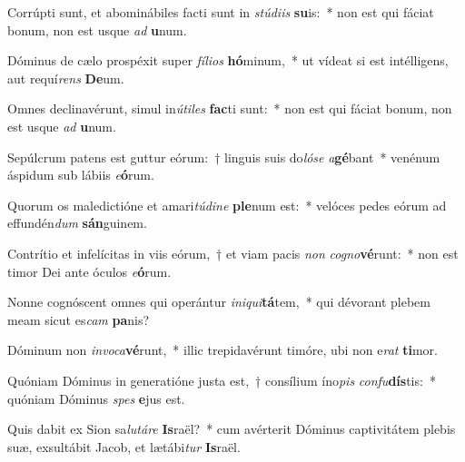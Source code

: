 \item Corrúpti sunt, et abominábiles facti sunt in \textit{stú}\textit{di}\textit{is} \textbf{su}is:~* non est qui fáciat bonum, non est usque \textit{ad} \textbf{u}num.
\item Dóminus de cælo prospéxit super \textit{fí}\textit{li}\textit{os} \textbf{hó}minum,~* ut vídeat si est intélligens, aut requí\textit{rens} \textbf{De}um.
\item Omnes declinavérunt, simul in\textit{ú}\textit{ti}\textit{les} \textbf{fac}ti sunt:~* non est qui fáciat bonum, non est usque \textit{ad} \textbf{u}num.
\item Sepúlcrum patens est guttur eórum:~† linguis suis do\textit{ló}\textit{se} \textit{a}\textbf{gé}bant~* venénum áspidum sub lábiis \textit{e}\textbf{ó}rum.
\item Quorum os maledictióne et amari\textit{tú}\textit{di}\textit{ne} \textbf{ple}num est:~* velóces pedes eórum ad effundén\textit{dum} \textbf{sán}guinem.
\item Contrítio et infelícitas in viis eórum,~† et viam pacis \textit{non} \textit{co}\textit{gno}\textbf{vé}runt:~* non est timor Dei ante óculos \textit{e}\textbf{ó}rum.
\item Nonne cognóscent omnes qui operántur \textit{in}\textit{i}\textit{qui}\textbf{tá}tem,~* qui dévorant plebem meam sicut es\textit{cam} \textbf{pa}nis?
\item Dóminum non \textit{in}\textit{vo}\textit{ca}\textbf{vé}runt,~* illic trepidavérunt timóre, ubi non e\textit{rat} \textbf{ti}mor.
\item Quóniam Dóminus in generatióne justa est,~† consílium íno\textit{pis} \textit{con}\textit{fu}\textbf{dís}tis:~* quóniam Dóminus \textit{spes} \textbf{e}jus est.
\item Quis dabit ex Sion sa\textit{lu}\textit{tá}\textit{re} \textbf{Is}raël?~* cum avérterit Dóminus captivitátem plebis suæ, exsultábit Jacob, et lætábi\textit{tur} \textbf{Is}raël.
